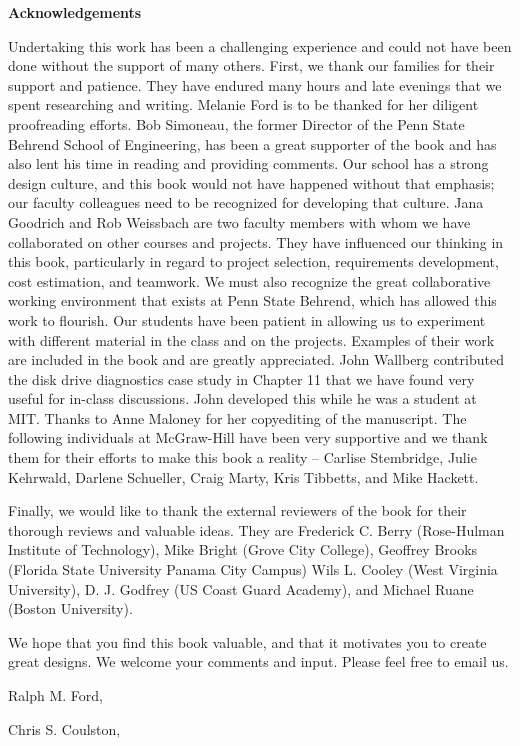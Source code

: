 \textbf{Acknowledgements}

Undertaking this work has been a challenging experience and could not
have been done without the support of many others. First, we thank our
families for their support and patience. They have endured many hours
and late evenings that we spent researching and writing. Melanie Ford is
to be thanked for her diligent proofreading efforts. Bob Simoneau, the
former Director of the Penn State Behrend School of Engineering, has
been a great supporter of the book and has also lent his time in reading
and providing comments. Our school has a strong design culture, and this
book would not have happened without that emphasis; our faculty
colleagues need to be recognized for developing that culture. Jana
Goodrich and Rob Weissbach are two faculty members with whom we have
collaborated on other courses and projects. They have influenced our
thinking in this book, particularly in regard to project selection,
requirements development, cost estimation, and teamwork. We must also
recognize the great collaborative working environment that exists at
Penn State Behrend, which has allowed this work to flourish. Our
students have been patient in allowing us to experiment with different
material in the class and on the projects. Examples of their work are
included in the book and are greatly appreciated. John Wallberg
contributed the disk drive diagnostics case study in Chapter 11 that we
have found very useful for in-class discussions. John developed this
while he was a student at MIT. Thanks to Anne Maloney for her
copyediting of the manuscript. The following individuals at McGraw-Hill
have been very supportive and we thank them for their efforts to make
this book a reality -- Carlise Stembridge, Julie Kehrwald, Darlene
Schueller, Craig Marty, Kris Tibbetts, and Mike Hackett.

Finally, we would like to thank the external reviewers of the book for
their thorough reviews and valuable ideas. They are Frederick C. Berry
(Rose-Hulman Institute of Technology), Mike Bright (Grove City College),
Geoffrey Brooks (Florida State University Panama City Campus) Wils L.
Cooley (West Virginia University), D. J. Godfrey (US Coast Guard
Academy), and Michael Ruane (Boston University).

We hope that you find this book valuable, and that it motivates you to
create great designs. We welcome your comments and input. Please feel
free to email us.

Ralph M. Ford, %

Chris S. Coulston,
